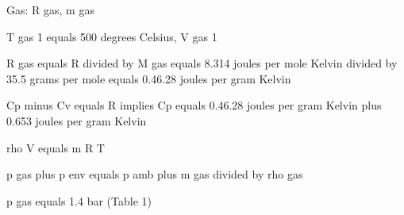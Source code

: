 Gas: R gas, m gas

T gas 1 equals 500 degrees Celsius, V gas 1

R gas equals R divided by M gas equals 8.314 joules per mole Kelvin divided by 35.5 grams per mole equals 0.46.28 joules per gram Kelvin

Cp minus Cv equals R implies Cp equals 0.46.28 joules per gram Kelvin plus 0.653 joules per gram Kelvin

rho V equals m R T

p gas plus p env equals p amb plus m gas divided by rho gas

p gas equals 1.4 bar (Table 1)